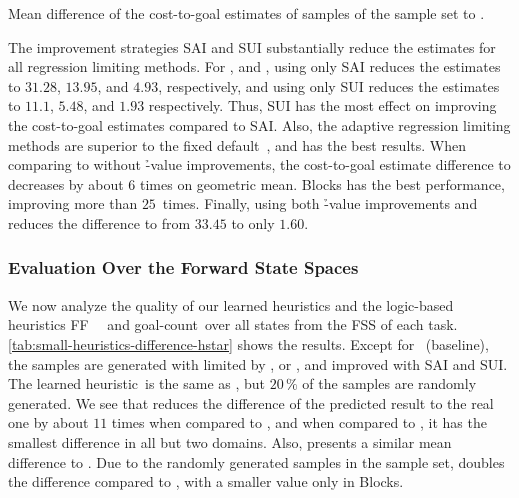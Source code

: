 \begin{table}[ht]
    \caption[Mean difference of the cost-to-goal estimates to \hstar.]{Mean difference of the cost-to-goal estimates of samples of the sample set to \hstar.}
    \label{tab:small-difference-hstar}
    \addmargin
    \centering
    
\end{table}

The improvement strategies SAI and SUI substantially reduce the estimates for all regression limiting methods. For \rldefault, \rlfacts and \rlmeanfx, using only SAI reduces the estimates to $31.28$, $13.95$, and $4.93$, respectively, and using only SUI reduces the estimates to $11.1$, $5.48$, and $1.93$ respectively. Thus, SUI has the most effect on improving the cost-to-goal estimates compared to SAI.
Also, the adaptive regression limiting methods are superior to the fixed default~\rldefault, and \rlmeanfx has the best results. When comparing \rldefault to \rlmeanfx without \h-value improvements, the cost-to-goal estimate difference to \hstar decreases by about $6$ times on geometric mean. Blocks has the best performance, improving more than $25$~times. Finally, using both \h-value improvements and \rlmeanfx reduces the difference to \hstar from $33.45$ to only $1.60$.

\subsubsection{Evaluation Over the Forward State Spaces}
\label{sec:small-exps-hvalue-fss}

We now analyze the quality of our learned heuristics and the logic-based heuristics FF~\hff~\cite{hoffmann2001ff} and goal-count~\hgc over all states from the FSS of each task. \cref{tab:small-heuristics-difference-hstar} shows the results. Except for \hnnbase~(baseline), the samples are generated with \bfsrw limited by \rldefault, \rlfacts or \rlmeanfx, and improved with SAI and SUI. The learned heuristic~\hnnrs is the same as \hnnl{\rlmeanfx}, but $20\,\%$ of the samples are randomly generated. We see that \hnnl{\rlmeanfx} reduces the difference of the predicted result to the real one by about $11$ times when compared to \hnnbase, and when compared to \hgc, it has the smallest difference in all but two domains. Also, \hnnl{\rlmeanfx} presents a similar mean difference to \hff. Due to the randomly generated samples in the sample set, \hnnrs doubles the difference compared to \hnnl{\rlmeanfx}, with a smaller value only in Blocks.

